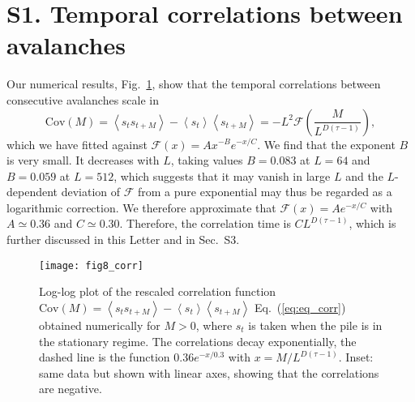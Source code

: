 \documentclass[doublecol]{epl2}
\newcommand{\ave}[1]{\left\langle{#1}\right\rangle}
\newcommand{\elabel}[1]{\label{eq:#1}}
\newcommand{\Eref}[1]{Eq.~(\ref{eq:#1})}
\newcommand{\Figref}[1]{Fig.~\ref{fig_#1}}
\begin{document}

\section{S1. Temporal correlations between avalanches}

Our numerical results, \Figref{corr}, show that the temporal correlations between consecutive avalanches scale in 
\begin{equation}
\text{Cov}(M)=\ave{s_ts_{t+M}}-\ave{s_t}\ave{s_{t+M}}=-L^2\mathcal{F}\left(\frac{M}{L^{D(\tau-1)}}\right),
\elabel{eq_corr}
\end{equation}
which we have fitted against $\mathcal{F}(x)=Ax^{-B}e^{-x/C}$. We find that the exponent $B$ is very small. It decreases with $L$, taking values $B=0.083$ at $L=64$ and $B=0.059$ at $L=512$, which suggests that it may vanish in large $L$ and the $L$-dependent deviation of $\mathcal{F}$ from a pure exponential may thus be regarded as a logarithmic correction. We therefore approximate that $\mathcal{F}(x)=Ae^{-x/C}$ with $A\simeq 0.36$ and $C\simeq 0.30$. Therefore, the correlation time is $CL^{D(\tau-1)}$, which is further discussed in this Letter and in Sec.~S3.

 \begin{figure}[h]
 \centering
\texttt{[image: fig8\_corr]}
\caption{ \label{fig_corr} Log-log plot of the rescaled correlation function $\text{Cov}(M)=\ave{s_ts_{t+M}}-\ave{s_t}\ave{s_{t+M}}$ \Eref{eq_corr} obtained numerically for $M>0$, where $s_t$ is taken when the pile is in the stationary regime. The correlations decay exponentially, the dashed line is the function $0.36e^{-x/0.3}$ with $x=M/L^{D(\tau-1)}$. Inset: same data but shown with linear axes, showing that the correlations are negative.}
\end{figure}
\end{document}
